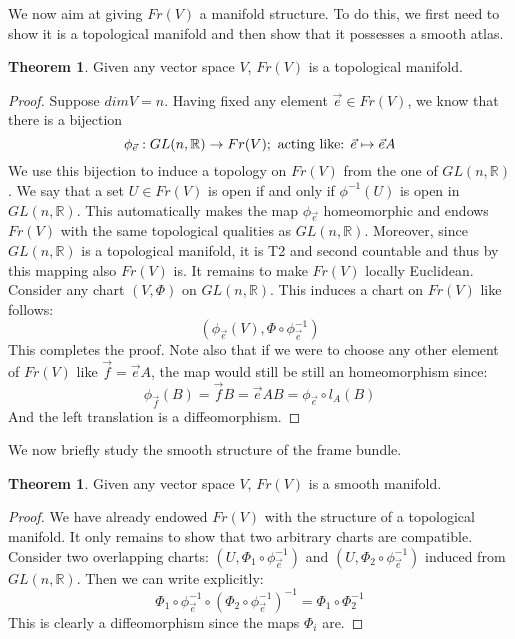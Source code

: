 \documentclass[12pt,a4paper]{report}
\theoremstyle{definition}
\theoremstyle{Theorem}
\newtheorem{Theo}[Def]{Theorem}
\theoremstyle{definition}
\theoremstyle{definition}
\begin{document}
	We now aim at giving $Fr(V)$ a manifold structure. To do this, we first need to show it is a topological manifold and then show that it possesses a smooth atlas.
	\begin{Theo}
		Given any vector space $V$, $Fr(V)$ is a topological manifold.
	\end{Theo}
	\begin{proof}
		Suppose $dim V=n$. Having fixed any element $\vec{e}\in Fr(V)$, we know that there is a bijection 
		$$\phi_{\vec{e}}:GL(n,\mathbb{R})\rightarrow Fr(V); \hbox{ acting like: }\vec{e}\mapsto\vec{e}A$$
		We use this bijection to induce a topology on $Fr(V)$ from the one of $GL(n,\mathbb{R})$. We say that a set $U\in Fr(V)$ is open if and only if $\phi^{-1}(U)$ is open in $GL(n,\mathbb{R})$. This automatically makes the map $\phi_{\vec{e}}$ homeomorphic and endows $Fr(V)$ with the same topological qualities as $GL(n,\mathbb{R})$. Moreover, since $GL(n,\mathbb{R})$ is a topological manifold, it is T2 and second countable and thus by this mapping also $Fr(V)$ is.
		It remains to make $Fr(V)$ locally Euclidean. Consider any chart $(V,\Phi)$ on $GL(n,\mathbb{R})$. This induces a chart on $Fr(V)$ like follows:
		$$(\phi_{\vec{e}}(V),\Phi\circ\phi^{-1}_{\vec{e}})$$
		This completes the proof.
		Note also that if we were to choose any other element of $Fr(V)$ like $\vec{f}=\vec{e}A$, the map would still be still an homeomorphism since:
		$$\phi_{\vec{f}}(B)=\vec{f}B=\vec{e}AB=\phi_{\vec{e}}\circ l_A(B)$$
		And the left translation is a diffeomorphism.
	\end{proof}
	We now briefly study the smooth structure of the frame bundle. 
	\begin{Theo}
		Given any vector space $V$, $Fr(V)$ is a smooth manifold.
	\end{Theo}
	\begin{proof}
		We have already endowed $Fr(V)$ with the structure of a topological manifold. It only remains to show that two arbitrary charts are compatible. Consider two overlapping charts: $(U,\Phi_1\circ\phi^{-1}_{\vec{e}})$ and $(U,\Phi_2\circ\phi^{-1}_{\vec{e}})$ induced from $GL(n,\mathbb{R})$. Then we can write explicitly:
		$$\Phi_1\circ\phi^{-1}_{\vec{e}}\circ (\Phi_2\circ\phi^{-1}_{\vec{e}})^{-1}=
		\Phi_1\circ \Phi_2^{-1}$$ 
		This is clearly a diffeomorphism since the maps $\Phi_i$ are.
	\end{proof}
\end{document}

